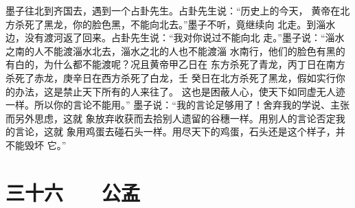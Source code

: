 \documentclass[12pt,UTF8]{ctexbook}
\begin{document}
墨子往北到齐国去，遇到一个占卦先生。占卦先生说：“历史上的今天， 
黄帝在北方杀死了黑龙，你的脸色黑，不能向北去。”墨子不听，竟继续向 
北走。到淄水边，没有渡河返了回来。占卦先生说：“我对你说过不能向北 
走。”墨子说：“淄水之南的人不能渡淄水北去，淄水之北的人也不能渡淄 
水南行，他们的脸色有黑的有白的，为什么都不能渡呢？况且黄帝甲乙日在 
东方杀死了青龙，丙丁日在南方杀死了赤龙，庚辛日在西方杀死了白龙，壬 
癸日在北方杀死了黑龙，假如实行你的办法，这是禁止天下所有的人来往了。 
这也是困蔽人心，使天下如同虚无人迹一样。所以你的言论不能用。” 
墨子说：“我的言论足够用了！舍弃我的学说、主张而另外思虑，这就 
象放弃收获而去拾别人遗留的谷穗一样。用别人的言论否定我的言论，这就 
象用鸡蛋去碰石头一样。用尽天下的鸡蛋，石头还是这个样子，并不能毁坏 
它。” 

\chapter{三十六　　公孟}
\end{document}
